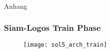 \section{}

\begin{frame}
	\center\Huge Anhang
\end{frame}

\begin{frame}
	\frametitle{Siam-Logos Train Phase}
	\begin{figure}
	        \centering
        		\texttt{[image: sol5\_arch\_train]} 
	\end{figure}
\end{frame}

